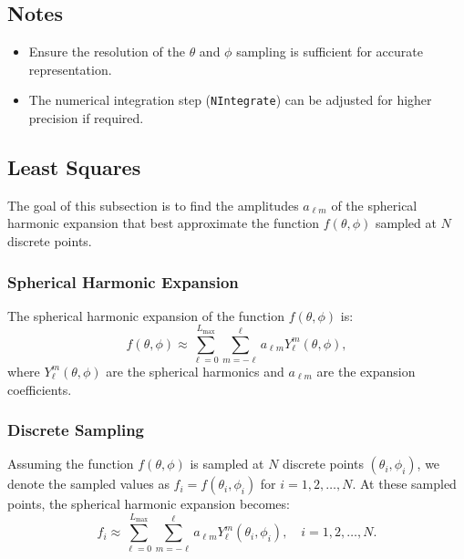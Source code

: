 \subsection{Notes}
\begin{itemize}
    \item Ensure the resolution of the \( \theta \) and \( \phi \) sampling is sufficient for accurate representation.
    \item The numerical integration step (\texttt{NIntegrate}) can be adjusted for higher precision if required.
\end{itemize}

\subsection*{Least Squares}

The goal of this subsection is to find the amplitudes $a_{\ell m}$ of the spherical harmonic expansion that best approximate the function $f(\theta, \phi)$ sampled at $N$ discrete points. 

\subsubsection*{Spherical Harmonic Expansion}
The spherical harmonic expansion of the function $f(\theta, \phi)$ is:
\[
f(\theta, \phi) \approx \sum_{\ell=0}^{L_{\text{max}}} \sum_{m=-\ell}^\ell a_{\ell m} Y_\ell^m(\theta, \phi),
\]
where $Y_\ell^m(\theta, \phi)$ are the spherical harmonics and $a_{\ell m}$ are the expansion coefficients.

\subsubsection*{Discrete Sampling}
Assuming the function $f(\theta, \phi)$ is sampled at $N$ discrete points $(\theta_i, \phi_i)$, we denote the sampled values as $f_i = f(\theta_i, \phi_i)$ for $i = 1, 2, \dots, N$. At these sampled points, the spherical harmonic expansion becomes:
\[
f_i \approx \sum_{\ell=0}^{L_{\text{max}}} \sum_{m=-\ell}^\ell a_{\ell m} Y_\ell^m(\theta_i, \phi_i), \quad i = 1, 2, \dots, N.
\]

